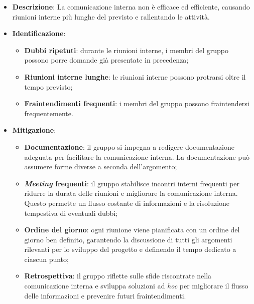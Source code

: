 \label{risk:comunicazione interna carente}
\begin{itemize}
	\item \textbf{Descrizione}:
	      La comunicazione interna non è efficace ed efficiente, causando riunioni
	      interne più lunghe del previsto e rallentando le attività.
	\item \textbf{Identificazione}:
	      \begin{itemize}
		      \item \textbf{Dubbi ripetuti}: durante le riunioni interne, i
		            membri del gruppo possono porre domande già presentate in
		            precedenza;

		      \item \textbf{Riunioni interne lunghe}: le riunioni interne
		            possono protrarsi oltre il tempo previsto;

		      \item \textbf{Fraintendimenti frequenti}: i membri del gruppo
		            possono fraintendersi frequentemente.

	      \end{itemize}
	\item \textbf{Mitigazione}:
	      \begin{itemize}
		      \item \textbf{Documentazione}: il gruppo si impegna a redigere 
			  		documentazione adeguata per facilitare la comunicazione interna. 
					La documentazione può assumere forme diverse a seconda dell'argomento;

		      \item \textbf{\textit{Meeting} frequenti}: il gruppo stabilisce incontri interni 
			  		frequenti per ridurre la durata delle riunioni e migliorare la comunicazione 
					interna. Questo permette un flusso costante di informazioni e la risoluzione 
					tempestiva di eventuali dubbi;

		      \item \textbf{Ordine del giorno}: ogni riunione viene pianificata con un ordine 
			  		del giorno ben definito, garantendo la discussione di tutti gli argomenti 
					rilevanti per lo sviluppo del progetto e definendo il tempo dedicato a 
					ciascun punto;

		      \item \textbf{Retrospettiva}: il gruppo riflette sulle sfide riscontrate nella 
			  		comunicazione interna e sviluppa soluzioni ad \textit{hoc} per migliorare 
					il flusso delle informazioni e prevenire futuri fraintendimenti.
	      \end{itemize}
\end{itemize}
